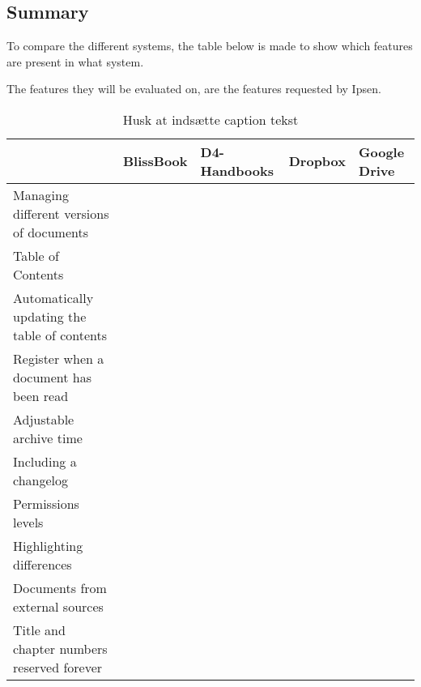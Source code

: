 \subsection{Summary}
To compare the different systems, the table below is made to show which features are present in what system.

The features they will be evaluated on, are the features requested by Ipsen.

\begin{table}[H]
	\begin{center}
		\begin{tabular}{| m{5cm}|m{1.6cm}|m{2cm}|m{1.5cm}|m{1.2cm}|}
			\hline
			& BlissBook  & D4-Handbooks & Dropbox & Google \newline Drive \\
			\hline
			Managing different versions of documents & \checkmark &  &  & \\
			\hline
			Table of Contents & \checkmark & \checkmark  & & \\
			\hline
			Automatically updating the table of contents & \checkmark & \checkmark  & \checkmark & \checkmark \\
			\hline
			Register when a document has been read & \checkmark & \checkmark &  & \\
			\hline
			Adjustable archive time &  &  &  & \\
			\hline
			Including a changelog & \checkmark & \checkmark  & \checkmark & \checkmark \\
			\hline
			Permissions levels & \checkmark &  & \checkmark & \checkmark \\
			\hline
			Highlighting differences & \checkmark &  &  & \\
			\hline
			Documents from external \newline sources &  &  & \checkmark & \checkmark \\
			\hline
			Title and chapter numbers \newline reserved forever &  &  &  & \\
			\hline
		\end{tabular}
		\caption{{\color{red} Husk at indsætte caption tekst}}\label{tab:Exsisting}
	\end{center}
\end{table}


